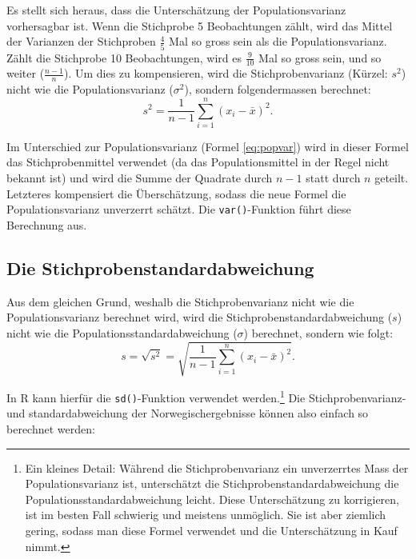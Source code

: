 \documentclass[oneside, 10pt]{book}\usepackage[]{graphicx}\usepackage[]{xcolor}
\begin{document}
Es stellt sich heraus, dass die Unterschätzung der Populationsvarianz
vorhersagbar ist. Wenn die Stichprobe 5 Beobachtungen zählt,
wird das Mittel der Varianzen der Stichproben $\frac{4}{5}$ Mal
so gross sein als die Populationsvarianz. Zählt die Stichprobe
10 Beobachtungen, wird es $\frac{9}{10}$ Mal so gross sein, und so weiter
($\frac{n-1}{n}$). Um dies zu kompensieren, wird die Stichprobenvarianz
(Kürzel: $s^2$) nicht wie die Populationsvarianz ($\sigma^2$),
sondern folgendermassen berechnet:
\begin{equation*}
s^2 = \frac{1}{n-1} \sum_{i = 1}^{n} (x_i - \bar{x})^2.
\end{equation*}

Im Unterschied zur Populationsvarianz (Formel \ref{eq:popvar}) wird in dieser Formel
das Stichprobenmittel verwendet (da das Populationsmittel
in der Regel nicht bekannt ist) und wird die Summe der Quadrate
durch $n-1$ statt durch $n$ geteilt. Letzteres kompensiert die
Überschätzung, sodass die neue Formel die Populationsvarianz unverzerrt schätzt.
Die \texttt{var()}-Funktion führt diese Berechnung aus.

\subsection{Die Stichprobenstandardabweichung}
Aus dem gleichen Grund, weshalb die Stichprobenvarianz
nicht wie die Populationsvarianz berechnet wird, wird die
Stichprobenstandardabweichung ($s$)
nicht wie die Populationsstandardabweichung ($\sigma$)
berechnet, sondern wie folgt:
\begin{equation*}
s = \sqrt{s^2} = \sqrt{\frac{1}{n-1} \sum_{i = 1}^{n} (x_i - \bar{x})^2}.
\end{equation*}

In R kann hierfür die \texttt{sd()}-Funktion verwendet werden.\footnote{Ein kleines Detail: Während die Stichprobenvarianz ein unverzerrtes Mass der Populationsvarianz ist, unterschätzt die Stichprobenstandardabweichung die Populationsstandardabweichung leicht. Diese Unterschätzung zu korrigieren, ist im besten Fall schwierig und meistens unmöglich. Sie ist aber ziemlich gering, sodass man diese Formel verwendet und die Unterschätzung in Kauf nimmt.\label{fn:samplesd}}
Die Stichprobenvarianz- und standardabweichung der Norwegischergebnisse
können also einfach so berechnet werden:
\end{document}
